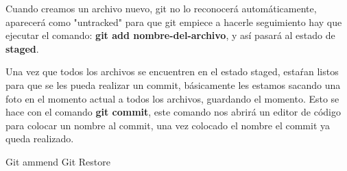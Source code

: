 Cuando creamos un archivo nuevo, git no lo reconocerá automáticamente, aparecerá como "untracked" para que git empiece a hacerle seguimiento hay que ejecutar el comando: \textbf{git add nombre-del-archivo}, y así pasará al estado de \textbf{staged}.

Una vez que todos los archivos se encuentren en el estado staged, estaŕan listos para que se les pueda realizar un commit, básicamente les estamos sacando una foto en el momento actual a todos los archivos, guardando el momento. Esto se hace con el comando \textbf{git commit}, este comando nos abrirá un editor de código para colocar un nombre al commit, una vez colocado el nombre el commit ya queda realizado.


Git ammend
Git Restore